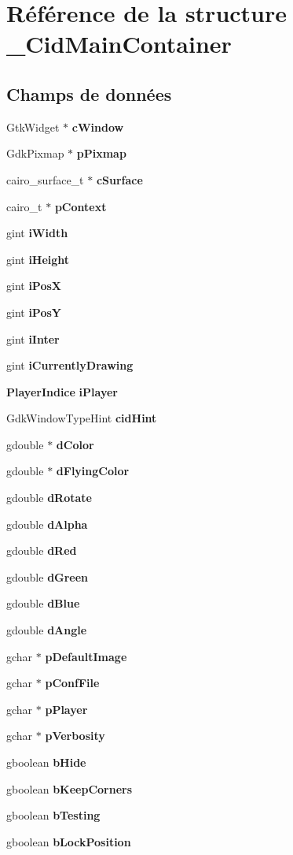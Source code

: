 \section{Référence de la structure \_\-CidMainContainer}
\label{struct__CidMainContainer}
\subsection*{Champs de données}
\begin{CompactItemize}
\item 
GtkWidget $\ast$ {\bf cWindow}
\item 
GdkPixmap $\ast$ {\bf pPixmap}
\item 
cairo\_\-surface\_\-t $\ast$ {\bf cSurface}
\item 
cairo\_\-t $\ast$ {\bf pContext}
\item 
gint {\bf iWidth}
\item 
gint {\bf iHeight}
\item 
gint {\bf iPosX}
\item 
gint {\bf iPosY}
\item 
gint {\bf iInter}
\item 
gint {\bf iCurrentlyDrawing}
\item 
{\bf PlayerIndice} {\bf iPlayer}
\item 
GdkWindowTypeHint {\bf cidHint}
\item 
gdouble $\ast$ {\bf dColor}
\item 
gdouble $\ast$ {\bf dFlyingColor}
\item 
gdouble {\bf dRotate}
\item 
gdouble {\bf dAlpha}
\item 
gdouble {\bf dRed}
\item 
gdouble {\bf dGreen}
\item 
gdouble {\bf dBlue}
\item 
gdouble {\bf dAngle}
\item 
gchar $\ast$ {\bf pDefaultImage}
\item 
gchar $\ast$ {\bf pConfFile}
\item 
gchar $\ast$ {\bf pPlayer}
\item 
gchar $\ast$ {\bf pVerbosity}
\item 
gboolean {\bf bHide}
\item 
gboolean {\bf bKeepCorners}
\item 
gboolean {\bf bTesting}
\item 
gboolean {\bf bLockPosition}

\end{CompactItemize}
